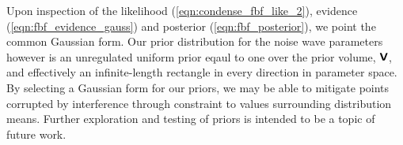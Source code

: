Upon inspection of the likelihood (\cref{eqn:condense_fbf_like_2}), evidence (\cref{eqn:fbf_evidence_gauss}) and posterior (\cref{eqn:fbf_posterior}), we point the common Gaussian form. Our prior distribution for the noise wave parameters however is an unregulated uniform prior eqaul to one over the prior volume, $\textbf{\textsf{V}}$, and effectively an infinite-length rectangle in every direction in parameter space. By selecting a Gaussian form for our priors, we may be able to mitigate points corrupted by interference through constraint to values surrounding distribution means. Further exploration and testing of priors is intended to be a topic of future work. 
